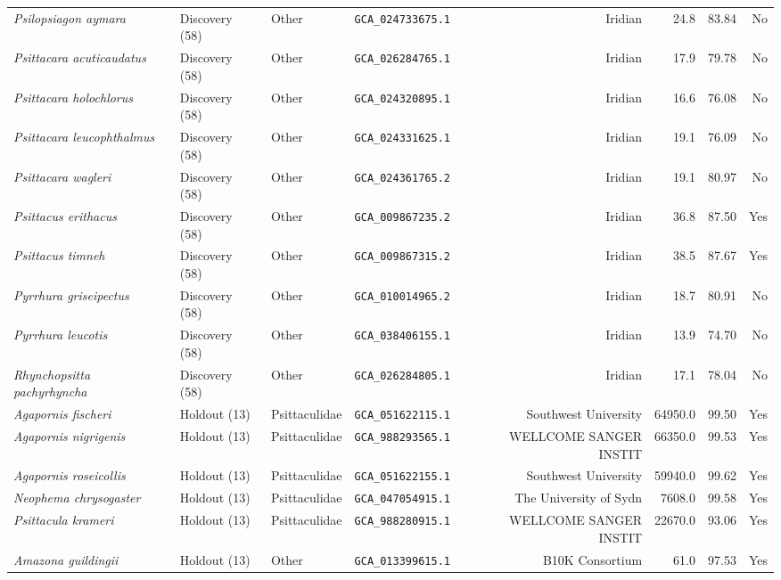 \documentclass[9pt,a4paper]{article}
\begin{document}
\begin{longtable}{llllrrrr}
\textit{Psilopsiagon aymara} & Discovery (58) & Other & \texttt{GCA\_024733675.1} & Iridian & 24.8 & 83.84 & No \\
\textit{Psittacara acuticaudatus} & Discovery (58) & Other & \texttt{GCA\_026284765.1} & Iridian & 17.9 & 79.78 & No \\
\textit{Psittacara holochlorus} & Discovery (58) & Other & \texttt{GCA\_024320895.1} & Iridian & 16.6 & 76.08 & No \\
\textit{Psittacara leucophthalmus} & Discovery (58) & Other & \texttt{GCA\_024331625.1} & Iridian & 19.1 & 76.09 & No \\
\textit{Psittacara wagleri} & Discovery (58) & Other & \texttt{GCA\_024361765.2} & Iridian & 19.1 & 80.97 & No \\
\textit{Psittacus erithacus} & Discovery (58) & Other & \texttt{GCA\_009867235.2} & Iridian & 36.8 & 87.50 & Yes \\
\textit{Psittacus timneh} & Discovery (58) & Other & \texttt{GCA\_009867315.2} & Iridian & 38.5 & 87.67 & Yes \\
\textit{Pyrrhura griseipectus} & Discovery (58) & Other & \texttt{GCA\_010014965.2} & Iridian & 18.7 & 80.91 & No \\
\textit{Pyrrhura leucotis} & Discovery (58) & Other & \texttt{GCA\_038406155.1} & Iridian & 13.9 & 74.70 & No \\
\textit{Rhynchopsitta pachyrhyncha} & Discovery (58) & Other & \texttt{GCA\_026284805.1} & Iridian & 17.1 & 78.04 & No \\
\textit{Agapornis fischeri} & Holdout (13) & Psittaculidae & \texttt{GCA\_051622115.1} & Southwest University & 64950.0 & 99.50 & Yes \\
\textit{Agapornis nigrigenis} & Holdout (13) & Psittaculidae & \texttt{GCA\_988293565.1} & WELLCOME SANGER INSTIT & 66350.0 & 99.53 & Yes \\
\textit{Agapornis roseicollis} & Holdout (13) & Psittaculidae & \texttt{GCA\_051622155.1} & Southwest University & 59940.0 & 99.62 & Yes \\
\textit{Neophema chrysogaster} & Holdout (13) & Psittaculidae & \texttt{GCA\_047054915.1} & The University of Sydn & 7608.0 & 99.58 & Yes \\
\textit{Psittacula krameri} & Holdout (13) & Psittaculidae & \texttt{GCA\_988280915.1} & WELLCOME SANGER INSTIT & 22670.0 & 93.06 & Yes \\
\textit{Amazona guildingii} & Holdout (13) & Other & \texttt{GCA\_013399615.1} & B10K Consortium & 61.0 & 97.53 & Yes \\

\end{longtable}
\end{document}

